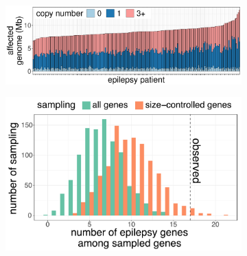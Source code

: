 \begin{figure}[!h]
  \centering
  \begin{subfigure}[b]{.64\textwidth}
    \includegraphics[width=\linewidth, page=4]{figures/epilepsy-CNVnumbers.pdf}
    \caption{}
    \label{fig:epicnv}
  \end{subfigure}
  \begin{subfigure}[b]{.35\textwidth}
    \includegraphics[width=\linewidth,page=1]{figures/epilepsy-enrichmentPatterns-long.pdf}
    \caption{}
    \label{fig:epicnvexex}
  \end{subfigure}
  

\end{figure}
